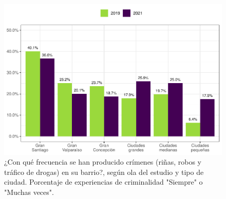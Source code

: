 \documentclass[
  12pt,
]{book}
\begin{document}
\begin{figure}

{\centering \includegraphics{reporte-elsoc_files/figure-latex/crim-estrato-1} 

}

\caption{¿Con qué frecuencia se han producido crímenes (riñas, robos y tráfico de drogas) en su barrio?, según ola del estudio y tipo de ciudad. Porcentaje de experiencias de criminalidad "Siempre" o "Muchas veces".}\label{fig:crim-estrato}
\end{figure}
\end{document}
